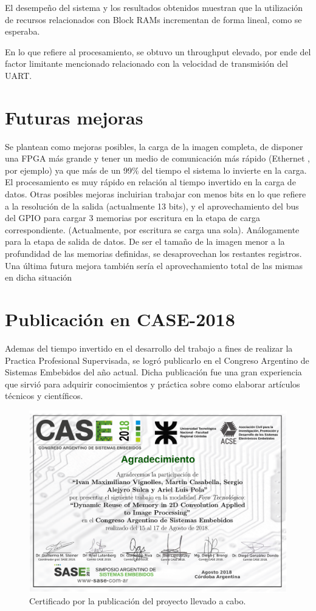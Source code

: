 El desempeño del sistema y los resultados obtenidos muestran que la utilización
de recursos relacionados con Block RAMs incrementan de forma lineal, como se
esperaba. 

En lo que refiere al procesamiento, se obtuvo un throughput elevado, por ende
del factor limitante mencionado relacionado con la velocidad de transmisión del
UART.

\section{Futuras mejoras}
Se plantean como mejoras posibles, la carga de la imagen completa, de disponer una FPGA más grande y tener un medio de comunicación más rápido (Ethernet , por ejemplo) 
ya que más de un 99$\%$ del tiempo el sistema lo invierte en la carga. El procesamiento es muy rápido en relación al tiempo invertido en la carga de datos.
Otras posibles mejoras incluirian trabajar con menos bits en lo que refiere a la resolución de la salida (actualmente 13 bits),  y el aprovechamiento del bus del GPIO para cargar 3 memorias por escritura en la etapa 
de carga correspondiente. (Actualmente, por escritura se carga una sola). Análogamente para la etapa de salida de datos.
De ser el tamaño de la imagen menor a la profundidad de las memorias definidas, se desaprovechan los restantes registros. 
Una última  futura mejora también sería el aprovechamiento total de las mismas en dicha situación

\section{Publicación en CASE-2018}
Ademas del tiempo invertido en el desarrollo del trabajo a fines de realizar la
Practica Profesional Supervisada, se logró publicarlo en el Congreso Argentino
de Sistemas Embebidos del año actual. Dicha publicación fue una gran experiencia
que sirvió para adquirir conocimientos y práctica sobre como elaborar artículos
técnicos y científicos.

\begin{figure}
\centering
\includegraphics[scale=0.5]{certificado_CASE}
\caption{Certificado por la publicación del proyecto llevado a cabo.}
\label{CASE}
\end{figure}